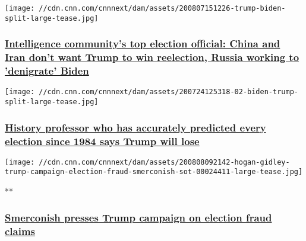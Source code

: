 \href{/2020/08/07/politics/2020-election-russia-china-iran/index.html}{}

\texttt{[image: //cdn.cnn.com/cnnnext/dam/assets/200807151226-trump-biden-split-large-tease.jpg]}

\hypertarget{intelligence-communitys-top-election-official-china-and-iran-dont-want-trump-to-win-reelection-russia-working-to-denigrate-biden}{%
\subsubsection{\texorpdfstring{\href{/2020/08/07/politics/2020-election-russia-china-iran/index.html}{Intelligence
community's top election official: China and Iran don't want Trump to
win reelection, Russia working to 'denigrate'
Biden}}{Intelligence community's top election official: China and Iran don't want Trump to win reelection, Russia working to 'denigrate' Biden}}\label{intelligence-communitys-top-election-official-china-and-iran-dont-want-trump-to-win-reelection-russia-working-to-denigrate-biden}}

\href{/2020/08/07/us/allan-lichtman-trump-biden-2020-trnd/index.html}{}

\texttt{[image: //cdn.cnn.com/cnnnext/dam/assets/200724125318-02-biden-trump-split-large-tease.jpg]}

\hypertarget{history-professor-who-has-accurately-predicted-every-election-since-1984-says-trump-will-lose}{%
\subsubsection{\texorpdfstring{\href{/2020/08/07/us/allan-lichtman-trump-biden-2020-trnd/index.html}{History
professor who has accurately predicted every election since 1984 says
Trump will
lose}}{History professor who has accurately predicted every election since 1984 says Trump will lose}}\label{history-professor-who-has-accurately-predicted-every-election-since-1984-says-trump-will-lose}}

\href{/videos/politics/2020/08/08/hogan-gidley-trump-campaign-election-fraud-smerconish-sot.cnn}{}

\texttt{[image: //cdn.cnn.com/cnnnext/dam/assets/200808092142-hogan-gidley-trump-campaign-election-fraud-smerconish-sot-00024411-large-tease.jpg]}

**

\hypertarget{smerconish-presses-trump-campaign-on-election-fraud-claims-}{%
\subsubsection{\texorpdfstring{\href{/videos/politics/2020/08/08/hogan-gidley-trump-campaign-election-fraud-smerconish-sot.cnn}{Smerconish
presses Trump campaign on election fraud claims
}}{Smerconish presses Trump campaign on election fraud claims }}\label{smerconish-presses-trump-campaign-on-election-fraud-claims-}}

